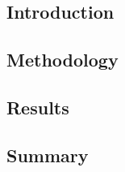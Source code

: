 \subsection{Introduction}


\subsection{Methodology} \label{methodology}


\subsection{Results} \label{results}


\subsection{Summary}

